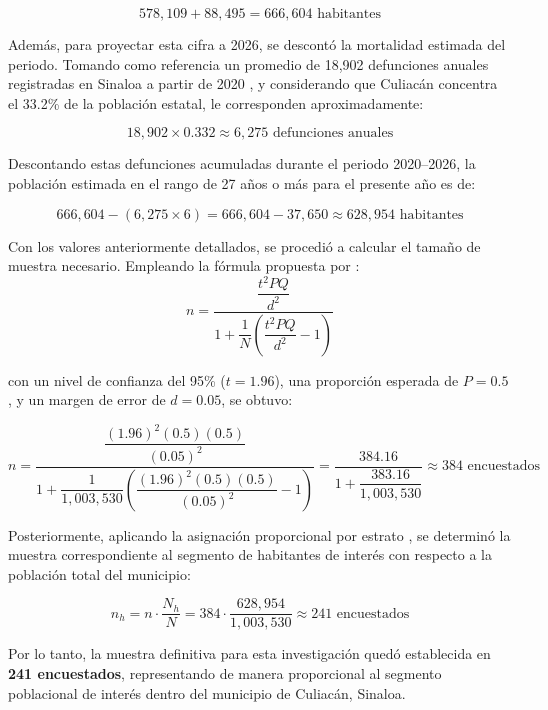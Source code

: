 \[
578{,}109 + 88{,}495 = 666{,}604 \text{ habitantes}
\]

Además, para proyectar esta cifra a 2026, se descontó la mortalidad estimada del periodo. 
Tomando como referencia un promedio de 18,902 defunciones anuales registradas en 
Sinaloa a partir de 2020 \parencite{inegi_mortalidad}, y considerando que Culiacán concentra el 33.2\% de la 
población estatal, le corresponden aproximadamente:

\[
18{,}902 \times 0.332 \approx 6{,}275 \text{ defunciones anuales}
\]

Descontando estas defunciones acumuladas durante el periodo 2020--2026, la 
población estimada en el rango de 27 años o más para el presente año es de:

\[
666{,}604 - (6{,}275 \times 6) = 666{,}604 - 37{,}650 \approx 628{,}954 
\text{ habitantes}
\]

Con los valores anteriormente detallados, se procedió a calcular el tamaño de 
muestra necesario. Empleando la fórmula
propuesta por \textcite[p.~75]{cochran1977}:
\[
n = \frac{\dfrac{t^2 PQ}{d^2}}{1 + \dfrac{1}{N}\left(\dfrac{t^2 PQ}{d^2} - 1\right)}
\]

\noindent con un nivel de confianza del 
95\% ($t = 1.96$), una proporción esperada de $P = 0.5$, y un margen de error 
de $d = 0.05$, se obtuvo:

\[
n = \frac{\dfrac{(1.96)^2 (0.5)(0.5)}{(0.05)^2}}{1 + \dfrac{1}{1{,}003{,}530}
\left(\dfrac{(1.96)^2 (0.5)(0.5)}{(0.05)^2} - 1\right)}
= \frac{384.16}{1 + \dfrac{383.16}{1{,}003{,}530}} \approx 384 \textrm{ encuestados}
\]

Posteriormente, aplicando la asignación proporcional por estrato \parencite[p.~91]{cochran1977},
se determinó la muestra correspondiente al segmento de habitantes de interés con respecto 
a la población total del municipio:

\[
n_h = n \cdot \frac{N_h}{N} = 384 \cdot \frac{628{,}954}{1{,}003{,}530} 
\approx 241 \textrm{ encuestados}
\]

Por lo tanto, la muestra definitiva para esta investigación quedó establecida 
en \textbf{241 encuestados}, representando de manera proporcional al segmento 
poblacional de interés dentro del municipio de Culiacán, Sinaloa.